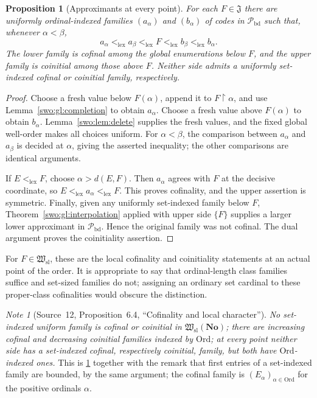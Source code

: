 \documentclass[11pt]{article}
\newtheorem{proposition}[proposition]{Proposition}
\theoremstyle{definition}
\theoremstyle{remark}
\newtheorem{note}[note]{Note}
\newcommand{\No}{\mathbf{No}}
\newcommand{\Ord}{\mathrm{Ord}}
\newcommand{\Hsl}{\mathfrak W_{\mathrm{sl}}}
\newcommand{\Jinj}{\mathfrak J}
\newcommand{\Pbd}{\mathcal P_{\mathrm{bd}}}
\newcommand{\lex}{\mathrm{lex}}
\begin{document}
\begin{proposition}[Approximants at every point]\label{swo:gl:local}
For each $F\in\Jinj$ there are uniformly ordinal-indexed families
$(a_\alpha)$ and $(b_\alpha)$ of codes in $\Pbd$ such that, whenever
$\alpha<\beta$,
\[
 a_\alpha<_{\lex}a_\beta<_{\lex}F
 <_{\lex}b_\beta<_{\lex}b_\alpha.
\]
The lower family is cofinal among the global enumerations below $F$, and the
upper family is coinitial among those above $F$.  Neither side admits a
uniformly set-indexed cofinal or coinitial family, respectively.
\end{proposition}

\begin{proof}
Choose a fresh value below $F(\alpha)$, append it to
$F\upharpoonright\alpha$, and use Lemma~\ref{swo:gl:completion} to obtain
$a_\alpha$.  Choose a fresh value above $F(\alpha)$ to obtain $b_\alpha$.
Lemma~\ref{swo:lem:delete} supplies the fresh values, and the fixed global
well-order makes all choices uniform.  For $\alpha<\beta$, the comparison
between $a_\alpha$ and $a_\beta$ is decided at $\alpha$, giving the asserted
inequality; the other comparisons are identical arguments.

If $E<_{\lex}F$, choose $\alpha>d(E,F)$.  Then $a_\alpha$ agrees with $F$
at the decisive coordinate, so $E<_{\lex}a_\alpha<_{\lex}F$.  This proves
cofinality, and the upper assertion is symmetric.  Finally, given any
uniformly set-indexed family below $F$, Theorem~\ref{swo:gl:interpolation}
applied with upper side $\{F\}$ supplies a larger lower approximant in
$\Pbd$.  Hence the original family was not cofinal.  The dual argument
proves the coinitiality assertion.
\end{proof}

For $F\in\Hsl$, these are the local cofinality and coinitiality statements
at an actual point of the order.  It is appropriate to say that ordinal-length
class families suffice and set-sized families do not; assigning an ordinary
set cardinal to these proper-class cofinalities would obscure the distinction.


\begin{note}[Source~12, Proposition~6.4, ``Cofinality and local character'']\label{swo:st:prop:characters}
\emph{No set-indexed uniform family is cofinal or coinitial in $\Hsl(\No)$;
there are increasing cofinal and decreasing coinitial families indexed by
$\Ord$; at every point neither side has a set-indexed cofinal, respectively
coinitial, family, but both have $\Ord$-indexed ones.} This is
\cref{swo:gl:local} together with the remark that first entries of a
set-indexed family are bounded, by the same argument; the cofinal family is
$(E_\alpha)_{\alpha\in\Ord}$ for the positive ordinals $\alpha$.
\end{note}
\end{document}
